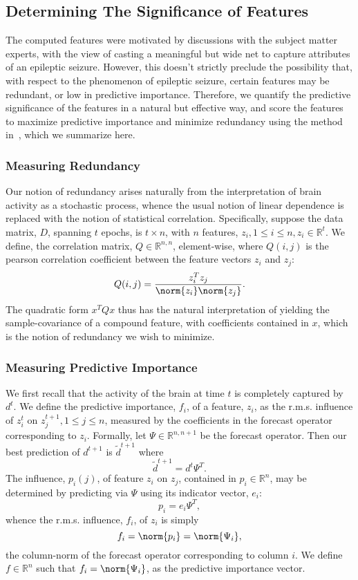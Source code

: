 \documentclass{article} %
\theoremstyle{definition}
\theoremstyle{remark}
\newcommand{\rl}{\mathbb{R}}
\newcommand{\rls}[1]{\mathbb{R}^{#1}}
\begin{document}
\subsection{Determining The Significance of Features}
The computed features were motivated by discussions with the subject matter experts, with the view of casting a meaningful but wide net to capture  attributes of an epileptic seizure. However, this doesn't strictly preclude the possibility that, with respect to the phenomenon of epileptic seizure, certain features may be redundant, or low in predictive importance. Therefore, we quantify the predictive significance of the features in a natural but effective way, and score the features to maximize predictive importance and minimize redundancy using the method in~\cite{quadprog_featsel}, which we summarize here.

\subsubsection{Measuring Redundancy}
Our notion of redundancy arises naturally from the interpretation of brain activity as a stochastic process, whence the usual notion of linear dependence is replaced with the notion of statistical correlation. Specifically, suppose the data matrix, $D$, spanning $t$ epochs, is $t \times n$, with $n$ features, $z_i, 1 \leq i \leq n, z_i \in \rl^t$. We define, the correlation matrix, $Q \in \rls{n, n}$, element-wise, where $Q(i, j)$ is the pearson correlation coefficient between the feature vectors $z_i$ and $z_j$:
\[ Q(i, j) = \frac{z_i ^T z_j}{\norm{z_i}\norm{z_j}}.  \]
The quadratic form $x^T Q x$ thus has the natural interpretation of yielding the sample-covariance of a compound feature, with coefficients contained in $x$, which is the notion of redundancy we wish to minimize.

\subsubsection{Measuring Predictive Importance}
We first recall that the activity of the brain at time $t$ is completely captured by $d^t$. We define the predictive importance, $f_i$, of a feature, $z_i$, as the r.m.s. influence of $z_i ^t$ on $z_j ^{t+1}, 1 \leq j \leq n$, measured by the coefficients in the forecast operator corresponding to $z_i$. Formally, let $\Psi \in \rls{n, n+1}$ be the forecast operator. Then our best prediction of $d^{t+1}$ is $\tilde{d}^{t+1}$ where
\[ \tilde d^{t+1} = d^t \Psi ^T. \]
The influence, $p_i (j)$, of feature $z_i$ on $z_j$, contained in $p_i \in \rl^n$, may be determined by predicting via $\Psi$ using its indicator vector, $e_i$:
\[ p_i = e_i \Psi^T,  \]
whence the r.m.s. influence, $f_i$, of $z_i$ is simply 
\[ f_i = \norm{p_i} = \norm{\Psi_i}, \]
the column-norm of the forecast operator corresponding to column $i$. We define $f \in \rl^n$ such that $f_i = \norm{\Psi_i}$, as the predictive importance vector. 
\end{document}
